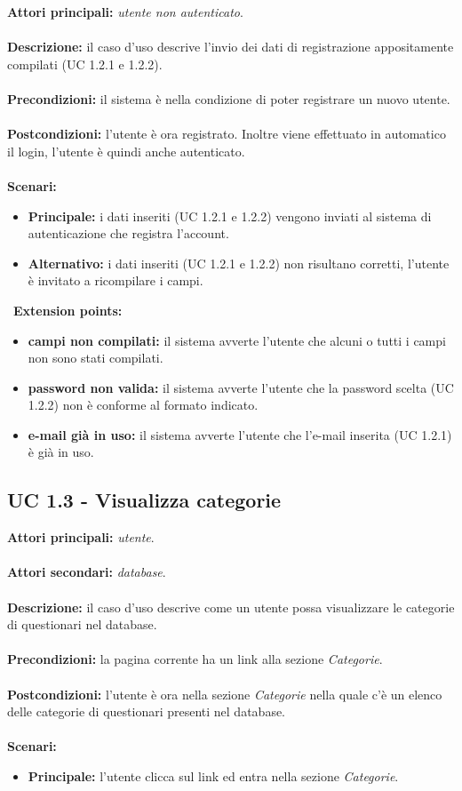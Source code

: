 \documentclass[a4paper,11pt]{article}
\begin{document}
\textbf{Attori principali:} \textit{utente non autenticato}.\\
\\
\textbf{Descrizione:} il caso d'uso descrive l'invio dei dati di registrazione appositamente compilati (UC 1.2.1 e 1.2.2).\\
\\
\textbf{Precondizioni:} il sistema è nella condizione di poter registrare un nuovo utente.\\
\\
\textbf{Postcondizioni:} l'utente è ora registrato. Inoltre viene effettuato in automatico il login, l'utente è quindi anche autenticato.\\
\\
\textbf{Scenari:}
\begin{itemize}
\item \textbf{Principale:} i dati inseriti (UC 1.2.1 e 1.2.2) vengono inviati al sistema di autenticazione che registra l'account.
\item \textbf{Alternativo:} i dati inseriti (UC 1.2.1 e 1.2.2) non risultano corretti, l'utente è invitato a ricompilare i campi.\\ 
\end{itemize}
\
\textbf{Extension points:}
\begin{itemize}
\item \textbf{campi non compilati:} il sistema avverte l'utente che alcuni o tutti i campi non sono stati compilati. 
\item \textbf{password non valida:} il sistema avverte l'utente che la password scelta (UC 1.2.2) non è conforme al formato indicato.
\item \textbf{e-mail già in uso:} il sistema avverte l'utente che l'e-mail inserita (UC 1.2.1) è già in uso.
\end{itemize}

\subsection{UC 1.3 - Visualizza categorie}

\textbf{Attori principali:} \textit{utente}.\\
\\
\textbf{Attori secondari:} \textit{database}.\\
\\
\textbf{Descrizione:} il caso d'uso descrive come un utente possa visualizzare le categorie di questionari nel database. \\
\\
\textbf{Precondizioni:} la pagina corrente ha un link alla sezione \textit{Categorie}. \\
\\
\textbf{Postcondizioni:} l'utente è ora nella sezione \textit{Categorie} nella quale c'è un elenco delle categorie di questionari presenti nel database. \\
\\
\textbf{Scenari:}
\begin{itemize}
\item \textbf{Principale:} l'utente clicca sul link ed entra nella sezione \textit{Categorie}.

\end{itemize}
\end{document}
